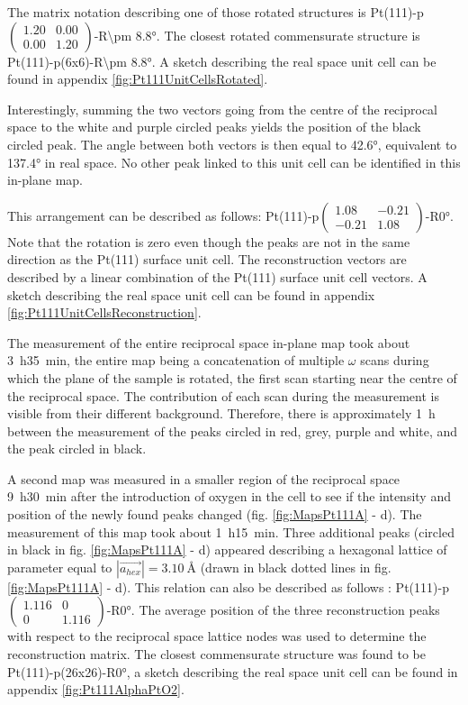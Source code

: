 The matrix notation describing one of those rotated structures is Pt(111)-p$\begin{pmatrix} 1.20 & 0.00\\ 0.00 & 1.20 \end{pmatrix}$-R\ang{\pm 8.8}.
The closest rotated commensurate structure is Pt(111)-p(6x6)-R\ang{\pm 8.8}.
A sketch describing the real space unit cell can be found in appendix \ref{fig:Pt111UnitCellsRotated}.

Interestingly, summing the two vectors going from the centre of the reciprocal space to the white and purple circled peaks yields the position of the black circled peak.
The angle between both vectors is then equal to \ang{42.6}, equivalent to \ang{137.4} in real space.
No other peak linked to this unit cell can be identified in this in-plane map.

This arrangement can be described as follows: Pt(111)-p$\begin{pmatrix} 1.08 & -0.21 \\ -0.21 & 1.08 \end{pmatrix}$-R\ang{0}.
Note that the rotation is zero even though the peaks are not in the same direction as the Pt(111) surface unit cell.
The reconstruction vectors are described by a linear combination of the Pt(111) surface unit cell vectors.
A sketch describing the real space unit cell can be found in appendix \ref{fig:Pt111UnitCellsReconstruction}.

The measurement of the entire reciprocal space in-plane map took about \qty{3}{\hour}\qty{35}{\minute}, the entire map being a concatenation of multiple $\omega$ scans during which the plane of the sample is rotated, the first scan starting near the centre of the reciprocal space.
The contribution of each scan during the measurement is visible from their different background.
Therefore, there is approximately \qty{1}{\hour} between the measurement of the peaks circled in red, grey, purple and white, and the peak circled in black.

A second map was measured in a smaller region of the reciprocal space \qty{9}{\hour}\qty{30}{\minute} after the introduction of oxygen in the cell to see if the intensity and position of the newly found peaks changed (fig. \ref{fig:MapsPt111A} - d).
The measurement of this map took about \qty{1}{\hour}\qty{15}{\minute}.
Three additional peaks (circled in black in fig. \ref{fig:MapsPt111A} - d) appeared describing a hexagonal lattice of parameter equal to $|\vec{a_{hex}}| = \qty{3.10}{\angstrom}$ (drawn in black dotted lines in fig. \ref{fig:MapsPt111A} - d).
This relation can also be described as follows : Pt(111)-p$\begin{pmatrix} 1.116 & 0 \\ 0 & 1.116 \end{pmatrix}$-R\ang{0}.
The average position of the three reconstruction peaks with respect to the reciprocal space lattice nodes was used to determine the reconstruction matrix.
The closest commensurate structure was found to be Pt(111)-p(26x26)-R\ang{0}, a sketch describing the real space unit cell can be found in appendix \ref{fig:Pt111AlphaPtO2}.

